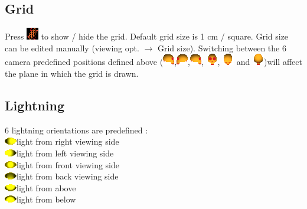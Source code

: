 \subsection{Grid}
Press \includegraphics{images/pixmap/grid3.png} to show / hide the grid. Default grid size is 1 cm / square. Grid size can be edited manually
(viewing opt. $\rightarrow$ Grid size).
Switching between the 6 camera predefined positions defined above (\includegraphics{images/pixmap/right2.png},\includegraphics{images/pixmap/left2.png},\includegraphics{images/pixmap/right2.png}, \includegraphics{images/pixmap/front2.png}, \includegraphics{images/pixmap/above2.png} and \includegraphics{images/pixmap/back2.png})will
affect the plane in which the grid is drawn.

\subsection{Lightning}
6 lightning orientations are predefined :\\
\includegraphics{images/pixmap/s_right_17.png}light from right viewing side\\
\includegraphics{images/pixmap/s_left_17.png}light from left viewing side\\
\includegraphics{images/pixmap/s_face_17.png}light from front viewing side\\
\includegraphics{images/pixmap/s_back_18.png}light from back viewing side\\
\includegraphics{images/pixmap/s_dessus_18.png}light from above\\
\includegraphics{images/pixmap/s_dessous_18.png}light from below\\


